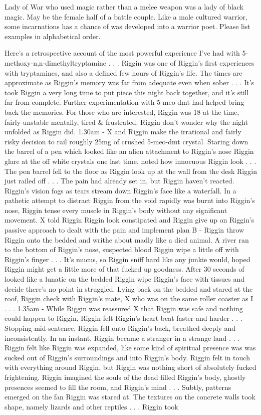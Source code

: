 \documentclass[12pt]{book}
\begin{document}
Lady of War who used magic rather than a melee weapon was a lady of black magic. May be the female half of a battle couple. Like a male cultured warrior, some incarnations has a chance of was developed into a warrior poet. Please list examples in alphabetical order.



Here's a retrospective account of the most powerful experience I've had with 5-methoxy-n,n-dimethyltryptamine . . .  Riggin was one of Riggin's first experiences with tryptamines, and also a defined few hours of Riggin's life. The times are approximate as Riggin's memory was far from adequate even when sober . . .  It's took Riggin a very long time to put piece this night back together, and it's still far from complete. Further experimentation with 5-meo-dmt had helped bring back the memories. For those who are interested, Riggin was 18 at the time, fairly unstable mentally, tired \& frustrated. Riggin don't wonder why the night unfolded as Riggin did. 1.30am - X and Riggin make the irrational and fairly risky decision to rail roughly 25mg of crushed 5-meo-dmt crystal. Staring down the barrel of a pen which looked like an alien attachment to Riggin's nose Riggin glare at the off white crystals one last time, noted how innocuous Riggin look . . .  The pen barrel fell to the floor as Riggin look up at the wall from the desk Riggin just railed off . . .  The pain had already set in, but Riggin haven't reacted. Riggin's vision fogs as tears stream down Riggin's face like a waterfall. In a pathetic attempt to distract Riggin from the void rapidly was burnt into Riggin's nose, Riggin tense every muscle in Riggin's body without any significant movement. X told Riggin Riggin look constipated and Riggin give up on Riggin's passive approach to dealt with the pain and implement plan B - Riggin throw Riggin onto the bedded and writhe about madly like a died animal. A river ran to the bottom of Riggin's nose, suspected blood Riggin wipe a little off with Riggin's finger . . .  It's mucus, so Riggin sniff hard like any junkie would, hoped Riggin might get a little more of that fucked up goodness. After 30 seconds of looked like a lunatic on the bedded Riggin wipe Riggin's face with tissues and decide there's no point in struggled. Lying back on the bedded and stared at the roof, Riggin check with Riggin's mate, X who was on the same roller coaster as I . . .  1.35am - While Riggin was reassured X that Riggin was safe and nothing could happen to Riggin, Riggin felt Riggin's heart beat faster and harder . . .  Stopping mid-sentence, Riggin fell onto Riggin's back, breathed deeply and inconsistently. In an instant, Riggin became a stranger in a strange land . . .  Riggin felt like Riggin was expanded, like some kind of spiritual presence was was sucked out of Riggin's surroundings and into Riggin's body. Riggin felt in touch with everything around Riggin, but Riggin was nothing short of absolutely fucked frightening. Riggin imagined the souls of the dead filled Riggin's body, ghostly presences seemed to fill the room, and Riggin's mind . . .  Subtly, patterns emerged on the fan Riggin was stared at. The textures on the concrete walls took shape, namely lizards and other reptiles . . .  Riggin took 
\end{document}
